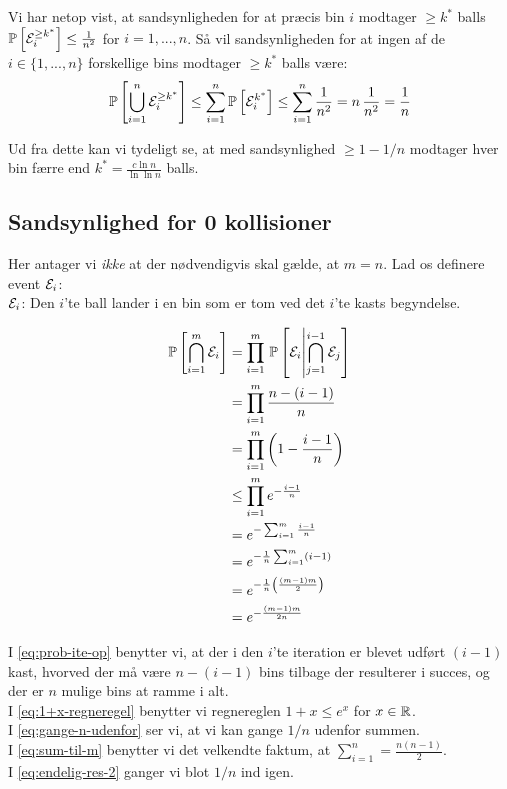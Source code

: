 Vi har netop vist, at sandsynligheden for at præcis bin $i$ modtager $\geq k^\ast$ balls $\mathbb{P} \left[   {\mathcal{E}}_i^{\geq k^\ast}   \right] \leq \frac{1}{n^2}$ for $i = 1, ..., n$.
Så vil sandsynligheden for at ingen af de $i \in \{1, ..., n\}$ forskellige bins modtager $\geq k^\ast$ balls være:
$$
\mathbb{P} \left[   \bigcup_{i=1}^n {\mathcal{E}}_i^{\geq k^\ast}   \right]
\leq \sum_{i=1}^n \mathbb{P} \left[   {\mathcal{E}}_i^{k^\ast}   \right]
\leq \sum_{i=1}^n \frac{1}{n^2}
= n \, \frac{1}{n^2}
= \frac{1}{n}
$$

Ud fra dette kan vi tydeligt se, at med sandsynlighed $\geq 1 - 1/n$ modtager hver bin færre end $k^\ast = \frac{c \ln n}{\ln \ln n}$ balls.

\subsection{Sandsynlighed for 0 kollisioner}
Her antager vi \emph{ikke} at der nødvendigvis skal gælde, at $m = n$. Lad os definere event ${\mathcal{E}}_i$:\\
${\mathcal{E}}_i$: Den $i$'te ball lander i en bin som er tom ved det $i$'te kasts begyndelse.


\begin{align}
  \mathbb{P} \left[  \bigcap_{i=1}^m {\mathcal{E}}_i  \right]
  &= \prod_{i=1}^m \, \mathbb{P} \left[  {\mathcal{E}}_i \middle| \bigcap_{j=1}^{i-1} {\mathcal{E}}_j  \right] \nonumber \\
  &= \prod_{i=1}^m \frac{n - (i-1)}{n} \label{eq:prob-ite-op} \\
  &= \prod_{i=1}^m \left(  1 - \frac{i-1}{n}  \right) \nonumber \\
  &\leq \prod_{i=1}^m e^{- \frac{i-1}{n}} \label{eq:1+x-regneregel} \\
  &= e^{ - \sum_{i=1}^m \frac{i-1}{n}} \nonumber\\
  &= e^{- \frac{1}{n} \sum_{i=1}^m (i - 1) } \label{eq:gange-n-udenfor} \\
  &= e^{- \frac{1}{n} \left( \frac{(m-1)m}{2} \right) }  \label{eq:sum-til-m}  \\
  &= e^{- \frac{(m-1)m}{2n}}  \label{eq:endelig-res-2}
\end{align}

I \cref{eq:prob-ite-op} benytter vi, at der i den $i$'te iteration er blevet udført $(i-1)$ kast, hvorved der må være $n - (i-1)$ bins tilbage der resulterer i succes, og der er $n$ mulige bins at ramme i alt.\\
I \cref{eq:1+x-regneregel} benytter vi regnereglen $1 + x \leq e^x$ for $x \in {\mathbb R}$.\\
I \cref{eq:gange-n-udenfor} ser vi, at vi kan gange $1/n$ udenfor summen.\\
I \cref{eq:sum-til-m} benytter vi det velkendte faktum, at $\sum_{i=1}^n = \frac{n(n-1)}{2}$.\\
I \cref{eq:endelig-res-2} ganger vi blot $1/n$ ind igen.\\

